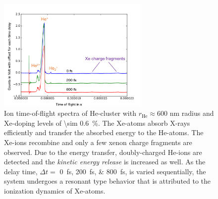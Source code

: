 \begin{figure}
	\centering
		\includegraphics[width=0.65\textwidth]{images/results/TOF-helium-xenon-cluster-60.png}
	\caption[TOF spectra of HeXe-clusters with \SI{\sim 0.6}{\percent} Xe-doping at various delays $\Delta t$.]{Ion time-of-flight spectra of He-cluster with $r_{\text{He}}\approx 600$ nm radius and Xe-doping levels of \SI{\sim 0.6}{\percent}. The Xe-atoms absorb X-rays efficiently and transfer the absorbed energy to the He-atoms. The Xe-ions recombine and only a few xenon charge fragments are observed. Due to the energy transfer, doubly-charged He-ions are detected and the \textit{kinetic energy release} is increased as well. As the delay time, $\Delta t=$ \SIlist{0;200;800}{\femto\second}, is varied sequentially, the system undergoes a resonant type behavior that is attributed to the ionization dynamics of Xe-atoms.}
	\label{fig:TOF-helium-xenon-cluster-60}
\end{figure}
